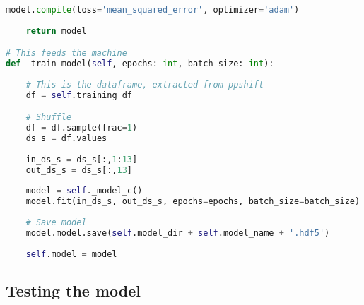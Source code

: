 \begin{lstlisting}[language=Python]
    model.compile(loss='mean_squared_error', optimizer='adam')
    
    return model

# This feeds the machine
def _train_model(self, epochs: int, batch_size: int):
    
    # This is the dataframe, extracted from ppshift
    df = self.training_df 

    # Shuffle
    df = df.sample(frac=1)
    ds_s = df.values
    
    in_ds_s = ds_s[:,1:13]
    out_ds_s = ds_s[:,13]
    
    model = self._model_c()    
    model.fit(in_ds_s, out_ds_s, epochs=epochs, batch_size=batch_size)
    
    # Save model
    model.model.save(self.model_dir + self.model_name + '.hdf5')
    
    self.model = model

\end{lstlisting}

\subsection{Testing the model}

